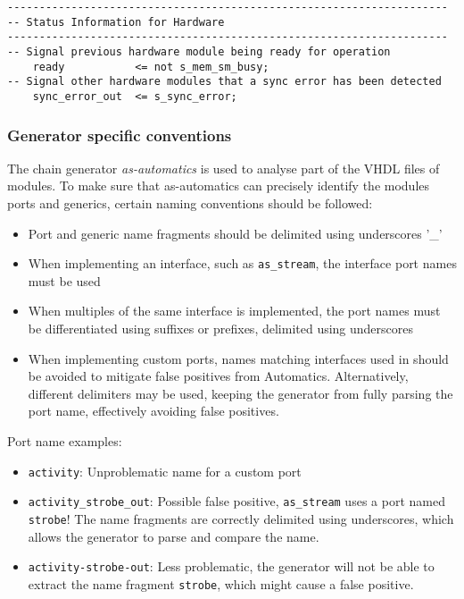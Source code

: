 \begin{lstlisting}[style=hdl, label=Code:ASSIGNMENT, caption=Exemplary comment for an assignment]
---------------------------------------------------------------------
-- Status Information for Hardware
---------------------------------------------------------------------
-- Signal previous hardware module being ready for operation
    ready           <= not s_mem_sm_busy;
-- Signal other hardware modules that a sync error has been detected
    sync_error_out  <= s_sync_error;
\end{lstlisting}


\subsubsection{Generator specific conventions}

The \asterics chain generator \textit{as-automatics} is used to analyse part of the VHDL files of \asterics modules.
To make sure that as-automatics can precisely identify the modules ports and generics, certain naming conventions should be followed:

\begin{itemize}
\item Port and generic name fragments should be delimited using underscores '\_'
\item When implementing an interface, such as \texttt{as\_stream}, the interface port names must be used
\item When multiples of the same interface is implemented, the port names must be differentiated using suffixes or prefixes, delimited using underscores
\item When implementing custom ports, names matching interfaces used in \asterics should be avoided to mitigate false positives from Automatics. Alternatively, different delimiters may be used, keeping the generator from fully parsing the port name, effectively avoiding false positives.
\end{itemize}

Port name examples:

\begin{itemize}
\item \texttt{activity}: Unproblematic name for a custom port
\item \texttt{activity\_strobe\_out}: Possible false positive, \texttt{as\_stream} uses a port named \texttt{strobe}! The name fragments are correctly delimited using underscores, which allows the generator to parse and compare the name.
\item \texttt{activity-strobe-out}: Less problematic, the generator will not be able to extract the name fragment \texttt{strobe}, which might cause a false positive.
\end{itemize}


